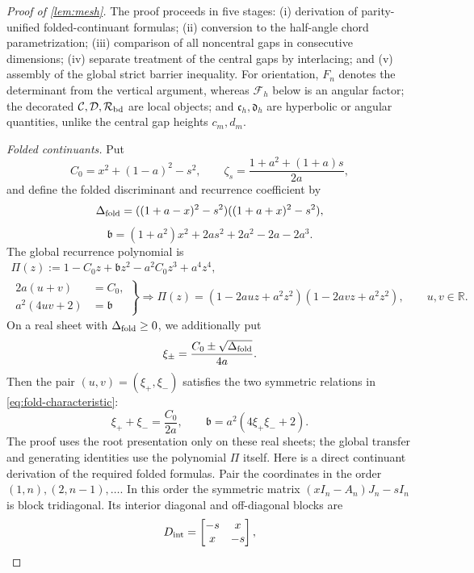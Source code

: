 \documentclass[review,hidelinks,onefignum,onetabnum]{siamart251216}
\begin{document}
\begin{proof}[Proof of \cref{lem:mesh}]
The proof proceeds in five stages: (i) derivation of parity-unified
folded-continuant formulas; (ii) conversion to the half-angle chord
parametrization; (iii) comparison of all noncentral gaps in consecutive
dimensions; (iv) separate treatment of the central gaps by interlacing; and
(v) assembly of the global strict barrier inequality.  For orientation,
\(F_n\) denotes the determinant from the vertical argument, whereas
\(\mathcal F_h\) below is an angular factor; the decorated
\(\mathcal C,\mathcal D,\mathcal R_{\rm bd}\) are local objects; and
\(\mathfrak c_h,\mathfrak d_h\) are hyperbolic or angular quantities, unlike
the central gap heights \(c_m,d_m\).

\medskip\noindent\emph{Folded continuants.}\quad
Put
\[
 C_0=x^2+(1-a)^2-s^2,\qquad
 \zeta_s=\frac{1+a^2+(1+a)s}{2a},
\]
and define the folded discriminant and recurrence coefficient by
\[
 \Delta_{\rm fold}=((1+a-x)^2-s^2)((1+a+x)^2-s^2),
\]
\[
 \mathfrak b=(1+a^2)x^2+2as^2+2a^2-2a-2a^3.
\]
The global recurrence polynomial is
\begin{equation}\label{eq:fold-characteristic}
\begin{gathered}
 \Pi(z):=1-C_0z+\mathfrak b z^2-a^2C_0z^3+a^4z^4,\\
 \left.
 \begin{aligned}
  2a(u+v)&=C_0,\\
  a^2(4uv+2)&=\mathfrak b
 \end{aligned}
 \right\}
 \Longrightarrow
 \Pi(z)=(1-2auz+a^2z^2)(1-2avz+a^2z^2),
 \qquad u,v\in\mathbb R.
\end{gathered}
\end{equation}
On a real sheet with \(\Delta_{\rm fold}\geq0\), we additionally put
\[
 \xi_\pm=\frac{C_0\pm\sqrt{\Delta_{\rm fold}}}{4a}.
\]
Then the pair \((u,v)=(\xi_+,\xi_-)\) satisfies the two symmetric
relations in \eqref{eq:fold-characteristic}:
\[
 \xi_++\xi_-=\frac{C_0}{2a},\qquad
 \mathfrak b=a^2(4\xi_+\xi_-+2).
\]
The proof uses the root presentation only on these real sheets; the global
transfer and generating identities use the polynomial \(\Pi\) itself.
Here is a direct continuant derivation of the required folded formulas.
Pair the coordinates in the order
\((1,n),(2,n-1),\ldots\).  In this order the symmetric matrix
\((xI_n-A_n)J_n-sI_n\) is block tridiagonal.  Its interior diagonal and
off-diagonal blocks are
\[
 D_{\rm int}=\begin{bmatrix}-s&x\\x&-s\end{bmatrix},
\]
\end{proof}
\end{document}
